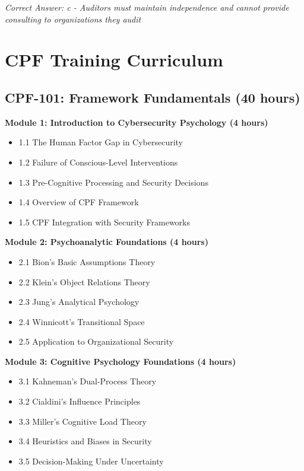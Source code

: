\documentclass[11pt,a4paper]{article}
\begin{document}
\textit{Correct Answer: c - Auditors must maintain independence and cannot provide consulting to organizations they audit}

\section{CPF Training Curriculum}

\subsection{CPF-101: Framework Fundamentals (40 hours)}

\textbf{Module 1: Introduction to Cybersecurity Psychology (4 hours)}
\begin{itemize}
\item 1.1 The Human Factor Gap in Cybersecurity
\item 1.2 Failure of Conscious-Level Interventions
\item 1.3 Pre-Cognitive Processing and Security Decisions
\item 1.4 Overview of CPF Framework
\item 1.5 CPF Integration with Security Frameworks
\end{itemize}

\textbf{Module 2: Psychoanalytic Foundations (4 hours)}
\begin{itemize}
\item 2.1 Bion's Basic Assumptions Theory
\item 2.2 Klein's Object Relations Theory
\item 2.3 Jung's Analytical Psychology
\item 2.4 Winnicott's Transitional Space
\item 2.5 Application to Organizational Security
\end{itemize}

\textbf{Module 3: Cognitive Psychology Foundations (4 hours)}
\begin{itemize}
\item 3.1 Kahneman's Dual-Process Theory
\item 3.2 Cialdini's Influence Principles
\item 3.3 Miller's Cognitive Load Theory
\item 3.4 Heuristics and Biases in Security
\item 3.5 Decision-Making Under Uncertainty
\end{itemize}
\end{document}
